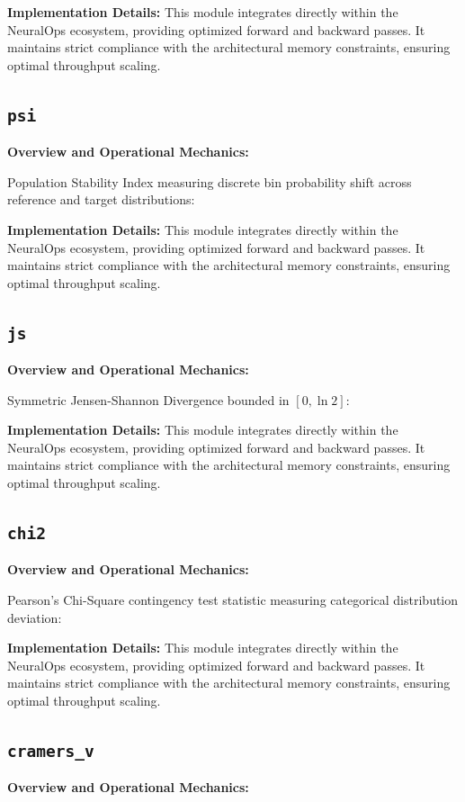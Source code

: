 \textbf{Implementation Details:}
This module integrates directly within the NeuralOps ecosystem, providing optimized forward and backward passes. It maintains strict compliance with the architectural memory constraints, ensuring optimal throughput scaling.

\subsection{\texttt{psi}}
\textbf{Overview and Operational Mechanics:}

Population Stability Index measuring discrete bin probability shift across reference and target distributions:

\textbf{Implementation Details:}
This module integrates directly within the NeuralOps ecosystem, providing optimized forward and backward passes. It maintains strict compliance with the architectural memory constraints, ensuring optimal throughput scaling.

\subsection{\texttt{js}}
\textbf{Overview and Operational Mechanics:}

Symmetric Jensen-Shannon Divergence bounded in $[0, \ln 2]$:

\textbf{Implementation Details:}
This module integrates directly within the NeuralOps ecosystem, providing optimized forward and backward passes. It maintains strict compliance with the architectural memory constraints, ensuring optimal throughput scaling.

\subsection{\texttt{chi2}}
\textbf{Overview and Operational Mechanics:}

Pearson's Chi-Square contingency test statistic measuring categorical distribution deviation:

\textbf{Implementation Details:}
This module integrates directly within the NeuralOps ecosystem, providing optimized forward and backward passes. It maintains strict compliance with the architectural memory constraints, ensuring optimal throughput scaling.

\subsection{\texttt{cramers\_v}}
\textbf{Overview and Operational Mechanics:}

